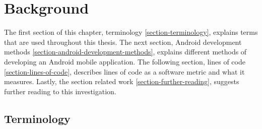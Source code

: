 \chapter{Background}\label{ch:background}
The first section of this chapter, terminology \ref{section-terminology}, explains terms that are used throughout this thesis. The next section, Android development methods \ref{section-android-development-methods}, explains different methods of developing an Android mobile application. The following section, lines of code \ref{section-lines-of-code}, describes lines of code as a software metric and what it measures. Lastly, the section related work \ref{section-further-reading}, suggests further reading to this investigation. 

\section{Terminology}\label{sec:terminology}
